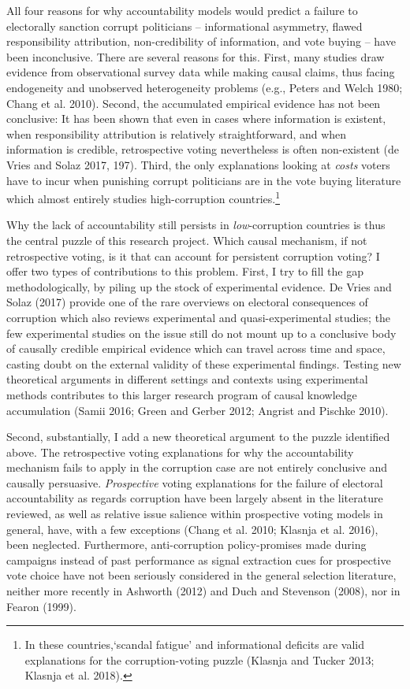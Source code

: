 \documentclass[11pt]{article}
\begin{document}
All four reasons for why accountability models would predict a failure to electorally sanction corrupt politicians -- informational asymmetry, flawed responsibility attribution, non-credibility of information, and vote buying -- have been inconclusive. There are several reasons for this. First, many studies draw evidence from observational survey data while making causal claims, thus facing endogeneity and unobserved heterogeneity problems (e.g., Peters and Welch 1980; Chang et al. 2010). Second, the accumulated empirical evidence has not been conclusive: It has been shown that even in cases where information is existent, when responsibility attribution is relatively straightforward, and when information is credible, retrospective voting nevertheless is often non-existent (de Vries and Solaz 2017, 197). Third, the only explanations looking at \textit{costs} voters have to incur when punishing corrupt politicians are in the vote buying literature which almost entirely studies high-corruption countries.\footnote{In these countries,`scandal fatigue' and informational deficits are valid explanations for the corruption-voting puzzle (Klasnja and Tucker 2013; Klasnja et al. 2018).}

Why the lack of accountability still persists in \textit{low}-corruption countries is thus the central puzzle of this research project. Which causal mechanism, if not retrospective voting, is it that can account for persistent corruption voting? I offer two types of contributions to this problem. First, I try to fill the gap methodologically, by piling up the stock of experimental evidence. De Vries and Solaz (2017) provide one of the rare overviews on electoral consequences of corruption which also reviews experimental and quasi-experimental studies; the few experimental studies on the issue still do not mount up to a conclusive body of causally credible empirical evidence which can travel across time and space, casting doubt on the external validity of these experimental findings. Testing new theoretical arguments in different settings and contexts using experimental methods contributes to this larger research program of causal knowledge accumulation (Samii 2016; Green and Gerber 2012; Angrist and Pischke 2010).

Second, substantially, I add a new theoretical argument to the puzzle identified above. The retrospective voting explanations for why the accountability mechanism fails to apply in the corruption case are not entirely conclusive and causally persuasive. \textit{Prospective} voting explanations for the failure of electoral accountability as regards corruption have been largely absent in the literature reviewed, as well as relative issue salience within prospective voting models in general, have, with a few exceptions (Chang et al. 2010; Klasnja et al. 2016), been neglected. Furthermore, anti-corruption policy-promises made during campaigns instead of past performance as signal extraction cues for prospective vote choice have not been seriously considered in the general selection literature, neither more recently in Ashworth (2012) and Duch and Stevenson (2008), nor in Fearon (1999).
\end{document}
